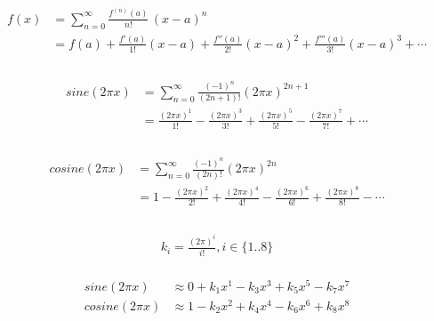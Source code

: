 \documentclass[12pt]{article}
\begin{document}
	\begin{align}
		\begin{split}
		f(x) &= \sum_{n=0} ^ {\infty} \frac {f^{(n)}(a)}{n!} \, (x-a)^{n} \\
		     &= f(a)+\frac {f'(a)}{1!} (x-a)+ \frac{f''(a)}{2!} (x-a)^2+\frac{f'''(a)}{3!}(x-a)^3+ \cdots \\
		\end{split}
	\end{align}

	\begin{align}
		\begin{split}
		sine(2\pi x) &= \sum_{n=0}^\infty \frac{(-1)^n}{(2n+1)!} (2\pi x)^{2n+1} \\
		             &= \frac{(2\pi x)^1}{1!} - \frac{(2\pi x)^3}{3!} + \frac{(2\pi x)^5}{5!} - \frac{(2\pi x)^7}{7!} + \cdots \\
		\end{split}
	\end{align}

	\begin{align}
		\begin{split}
		cosine(2\pi x) &= \sum_{n=0}^\infty \frac{(-1)^n}{(2n)!} (2\pi x)^{2n} \\
		               &= 1 - \frac{(2\pi x)^2}{2!} + \frac{(2\pi x)^4}{4!} - \frac{(2\pi x)^6}{6!} + \frac{(2\pi x)^8}{8!} - \cdots \\
		\end{split}
	\end{align}

	\begin{align}
		\begin{split}
		k_i = \frac{(2\pi)^i}{i!}, i \in \{1..8\}
		\end{split}
	\end{align}

	\begin{align}
		\begin{split}
		sine(2\pi x)   &\approx 0 + k_1 x^1 - k_3 x^3 + k_5 x^5 - k_7 x^7 \\
		cosine(2\pi x) &\approx 1 - k_2 x^2 + k_4 x^4 - k_6 x^6 + k_8 x^8 \\
		\end{split}
	\end{align}
\end{document}
